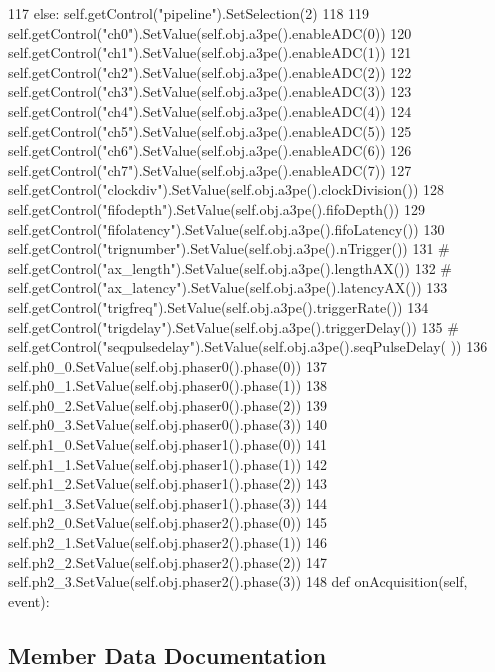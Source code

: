 \begin{DoxyCode}
117         else: self.getControl("pipeline").SetSelection(2)            
118             
119         self.getControl("ch0").SetValue(self.obj.a3pe().enableADC(0))
120         self.getControl("ch1").SetValue(self.obj.a3pe().enableADC(1))
121         self.getControl("ch2").SetValue(self.obj.a3pe().enableADC(2))
122         self.getControl("ch3").SetValue(self.obj.a3pe().enableADC(3))
123         self.getControl("ch4").SetValue(self.obj.a3pe().enableADC(4))
124         self.getControl("ch5").SetValue(self.obj.a3pe().enableADC(5))
125         self.getControl("ch6").SetValue(self.obj.a3pe().enableADC(6))
126         self.getControl("ch7").SetValue(self.obj.a3pe().enableADC(7))
127         self.getControl("clockdiv").SetValue(self.obj.a3pe().clockDivision())
128         self.getControl("fifodepth").SetValue(self.obj.a3pe().fifoDepth())
129         self.getControl("fifolatency").SetValue(self.obj.a3pe().fifoLatency())
130         self.getControl("trignumber").SetValue(self.obj.a3pe().nTrigger())
131 #        self.getControl("ax_length").SetValue(self.obj.a3pe().lengthAX())
132 #        self.getControl("ax_latency").SetValue(self.obj.a3pe().latencyAX())
133         self.getControl("trigfreq").SetValue(self.obj.a3pe().triggerRate())
134         self.getControl("trigdelay").SetValue(self.obj.a3pe().triggerDelay())
135 #        self.getControl("seqpulsedelay").SetValue(self.obj.a3pe().seqPulseDelay(
      ))
136         self.ph0_0.SetValue(self.obj.phaser0().phase(0))
137         self.ph0_1.SetValue(self.obj.phaser0().phase(1))
138         self.ph0_2.SetValue(self.obj.phaser0().phase(2))
139         self.ph0_3.SetValue(self.obj.phaser0().phase(3))
140         self.ph1_0.SetValue(self.obj.phaser1().phase(0))
141         self.ph1_1.SetValue(self.obj.phaser1().phase(1))
142         self.ph1_2.SetValue(self.obj.phaser1().phase(2))
143         self.ph1_3.SetValue(self.obj.phaser1().phase(3))
144         self.ph2_0.SetValue(self.obj.phaser2().phase(0))
145         self.ph2_1.SetValue(self.obj.phaser2().phase(1))
146         self.ph2_2.SetValue(self.obj.phaser2().phase(2))
147         self.ph2_3.SetValue(self.obj.phaser2().phase(3))                
148         
    def onAcquisition(self, event):
\end{DoxyCode}


\subsection{Member Data Documentation}
\hypertarget{classProto40MHz__v1_1_1Proto40MHz__v1_ae44e4ded38989bfd42444e5ed2b0afd2}{
\subsubsection[{modeCh}]{}}
\label{classProto40MHz__v1_1_1Proto40MHz__v1_ae44e4ded38989bfd42444e5ed2b0afd2}


